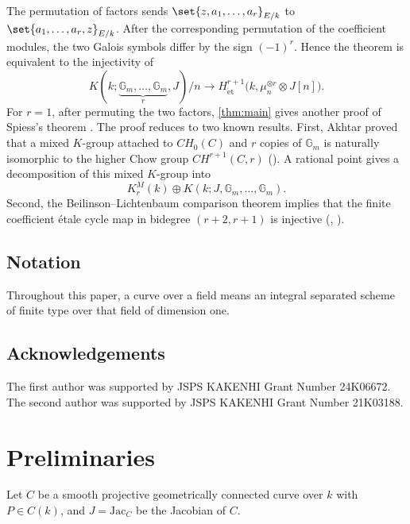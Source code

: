 \documentclass[a4paper,12pt]{amsart}
\numberwithin{equation}{section}
\theoremstyle{definition}
\newcommand{\Gm}{\mathbb{G}_{m}}
\newcommand{\Het}{H_{\mathrm{\acute et}}}
\begin{document}
The permutation of factors sends
$\set{z,a_1,\ldots,a_r}_{E/k}$ to
$\set{a_1,\ldots,a_r,z}_{E/k}$.  After the corresponding permutation
of the coefficient modules, the two Galois symbols differ by the sign
$(-1)^r$.  Hence the theorem is equivalent to the injectivity of
\[
 K(k;\underbrace{\Gm,\ldots,\Gm}_{r},J)/n
 \to 
 \Het^{r+1}\bigl(k,\mu_n^{\otimes r}\otimes J[n]\bigr).
\]
For $r=1$, after permuting the two factors,
\autoref{thm:main} gives another proof of Spiess's theorem \cite[Appendix, Theorem 6.1]{Yam05}.  
The proof reduces to two known results.  First, Akhtar proved that
a mixed $K$-group attached to $CH_0(C)$ and $r$ copies of
$\Gm$ is naturally isomorphic to the higher Chow group $CH^{r+1}(C,r)$ 
(\cite[Theorem~6.1]{Akh04}).  A rational point gives a decomposition of
this mixed $K$-group into
\[
 K_r^M(k)\oplus K(k;J,\Gm,\ldots,\Gm).
\]
Second, the Beilinson--Lichtenbaum comparison theorem implies that the
finite coefficient \'etale cycle map in bidegree $(r+2,r+1)$ is
injective (\cite[Corollary~1.2]{GL01}, \cite[Theorem~6.17]{Voe11}). 

\subsection*{Notation} 
Throughout this paper, a curve over a field means an integral
separated scheme of finite type over that field of dimension one.

\subsection*{Acknowledgements} 
The first author was supported by JSPS KAKENHI Grant Number 24K06672.
The second author was supported by JSPS KAKENHI Grant Number 21K03188.


\section{Preliminaries}

Let $C$ be a smooth projective geometrically connected curve over $k$ with $P\in C(k)$, and $J = \mathrm{Jac}_C$ be the Jacobian of $C$.
\end{document}
